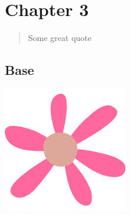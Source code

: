 \documentclass[../book/latex-book.tex]{subfiles}
\begin{document}
\chapter{Chapter 3}
\begin{quote}
Some great quote
\end{quote}
\section{Base}

\begin{center}
  \includegraphics{images/flower1.jpeg}
\end{center}
\end{document}

